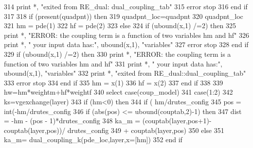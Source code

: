 \begin{DoxyCode}
314         print *, \textcolor{stringliteral}{"exited from RE\_dual: dual\_coupling\_tab"}
315         error stop
316 \textcolor{keywordflow}{      end if}
317       
318         \textcolor{keywordflow}{if} (\textcolor{keyword}{present}(quadpnt)) \textcolor{keywordflow}{then}
319           quadpnt\_loc=quadpnt
320           quadpnt\_loc%
321           hm = pde(1)%
322           hf = pde(2)%
323     \textcolor{keywordflow}{else}
324         \textcolor{keywordflow}{if} (ubound(x,1) /=2) \textcolor{keywordflow}{then}
325           print *, \textcolor{stringliteral}{"ERROR: the coupling term is a function of two variables hm and hf"}
326           print *, \textcolor{stringliteral}{"       your input data has:"}, ubound(x,1), \textcolor{stringliteral}{"variables"}
327           error stop
328 \textcolor{keywordflow}{        end if}
329     \textcolor{keywordflow}{if} (ubound(x,1) /=2) \textcolor{keywordflow}{then}
330           print *, \textcolor{stringliteral}{"ERROR: the coupling term is a function of two variables hm and hf"}
331           print *, \textcolor{stringliteral}{"       your input data has:"}, ubound(x,1), \textcolor{stringliteral}{"variables"}
332           print *, \textcolor{stringliteral}{"exited from RE\_dual::dual\_coupling\_tab"}
333           error stop
334 \textcolor{keywordflow}{        end if}
335            hm = x(1)
336            hf = x(2)
337 \textcolor{keywordflow}{    end if}
338 
339     hw=hm*weightm+hf*weightf
340         \textcolor{keywordflow}{select case}(coup_model)
341                 \textcolor{keywordflow}{case}(1:2)
342                  ks=vgexchange(layer)%
343                 \textcolor{keywordflow}{if} (hm<0) \textcolor{keywordflow}{then}
344                   \textcolor{keywordflow}{if} ( hm/drutes_config%
345                         pos = int(-hm/drutes_config%
346                         \textcolor{keywordflow}{if} (abs(pos) <= ubound(couptab,2)-1) \textcolor{keywordflow}{then}
347                           dist = -hm - (pos - 1)*drutes_config%
348                           ka\_m = (couptab(layer,pos+1)-couptab(layer,pos))/
      drutes_config%
349 \textcolor{comment}{                          + couptab(layer,pos)}
350 \textcolor{comment}{                        }\textcolor{keywordflow}{else}
351                           ka\_m= dual\_coupling\_k(pde\_loc,layer,x=[hm])
352 \textcolor{keywordflow}{                        end if}

\end{DoxyCode}
